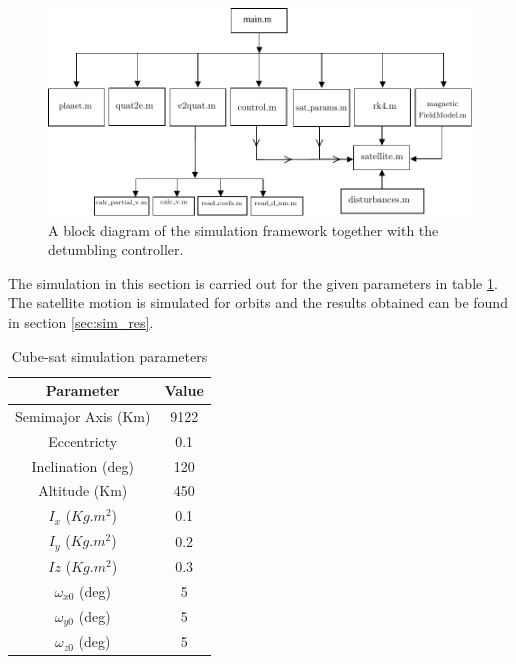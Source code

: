 \begin{figure}
    \centering
    \includegraphics[width = \textwidth]{Figures/flow_chart.pdf}
    \caption{A block diagram of the simulation framework together with the detumbling controller.}
    \label{fig:block}
\end{figure}
The simulation in this section is carried out for the given parameters in table \ref{tab:parms}.
The satellite motion is simulated for orbits and the results obtained can be found in section \ref{sec:sim_res}.
\begin{table}[h]
    \centering
    \begin{tabular}{@{}cc@{}}
    \toprule 
     Parameter & Value \\
    \midrule 
     Semimajor Axis (Km) & 9122 \\
    Eccentricty & 0.1 \\
    Inclination (deg) & 120 \\
    Altitude (Km) & 450 \\
    $ I_{x}$ ($ Kg.m^{2}$) & 0.1 \\
    $ I_{y}$ ($ Kg.m^{2}$) & 0.2 \\
    $ Iz$ ($ Kg.m^{2}$) & 0.3 \\
    $ \omega_{x0}$ (deg) & 5 \\
    $ \omega_{y0}$ (deg) & 5 \\
    $ \omega_{z0}$ (deg) & 5 \\
     \bottomrule
    \end{tabular}
    \caption{Cube-sat simulation parameters}
    \label{tab:parms}
\end{table}
\clearpage


